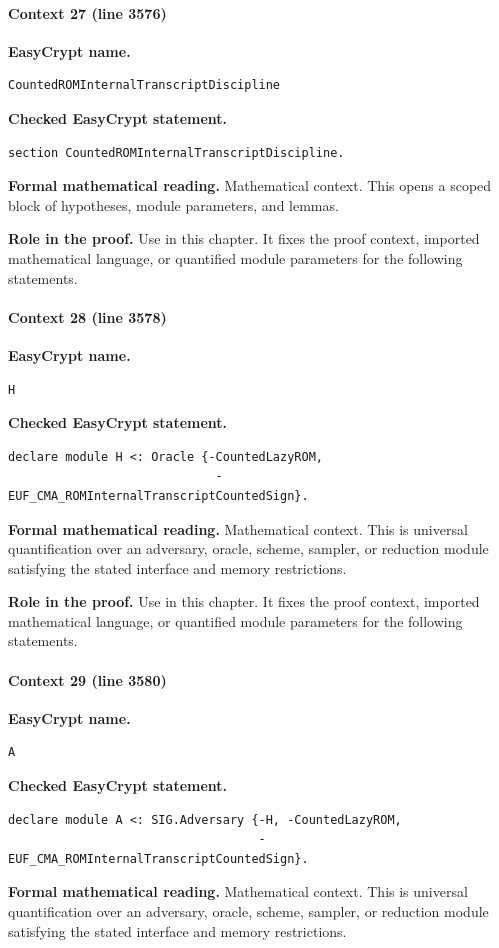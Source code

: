 \paragraph{Context 27 (line 3576)}
\noindent\textbf{EasyCrypt name.}
\begin{lstlisting}[language=EasyCrypt,basicstyle=\ttfamily\scriptsize]
CountedROMInternalTranscriptDiscipline
\end{lstlisting}
\noindent\textbf{Checked EasyCrypt statement.}
\begin{lstlisting}[language=EasyCrypt,basicstyle=\ttfamily\scriptsize]
section CountedROMInternalTranscriptDiscipline.
\end{lstlisting}
\noindent\textbf{Formal mathematical reading.}
Mathematical context. This opens a scoped block of hypotheses, module parameters, and lemmas.

\noindent\textbf{Role in the proof.}
Use in this chapter. It fixes the proof context, imported mathematical language, or quantified module parameters for the following statements.

\paragraph{Context 28 (line 3578)}
\noindent\textbf{EasyCrypt name.}
\begin{lstlisting}[language=EasyCrypt,basicstyle=\ttfamily\scriptsize]
H
\end{lstlisting}
\noindent\textbf{Checked EasyCrypt statement.}
\begin{lstlisting}[language=EasyCrypt,basicstyle=\ttfamily\scriptsize]
declare module H <: Oracle {-CountedLazyROM,
                             -EUF_CMA_ROMInternalTranscriptCountedSign}.
\end{lstlisting}
\noindent\textbf{Formal mathematical reading.}
Mathematical context. This is universal quantification over an adversary, oracle, scheme, sampler, or reduction module satisfying the stated interface and memory restrictions.

\noindent\textbf{Role in the proof.}
Use in this chapter. It fixes the proof context, imported mathematical language, or quantified module parameters for the following statements.

\paragraph{Context 29 (line 3580)}
\noindent\textbf{EasyCrypt name.}
\begin{lstlisting}[language=EasyCrypt,basicstyle=\ttfamily\scriptsize]
A
\end{lstlisting}
\noindent\textbf{Checked EasyCrypt statement.}
\begin{lstlisting}[language=EasyCrypt,basicstyle=\ttfamily\scriptsize]
declare module A <: SIG.Adversary {-H, -CountedLazyROM,
                                   -EUF_CMA_ROMInternalTranscriptCountedSign}.
\end{lstlisting}
\noindent\textbf{Formal mathematical reading.}
Mathematical context. This is universal quantification over an adversary, oracle, scheme, sampler, or reduction module satisfying the stated interface and memory restrictions.

